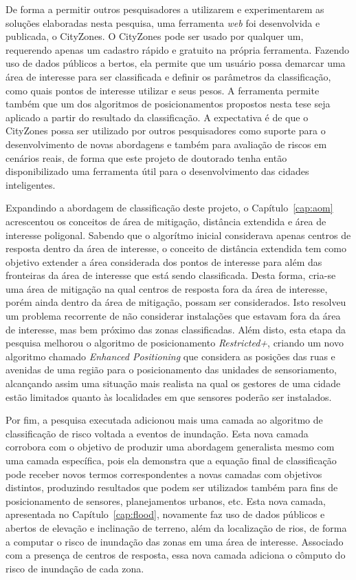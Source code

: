 De forma a permitir outros pesquisadores a utilizarem e experimentarem as soluções elaboradas nesta pesquisa, uma ferramenta \emph{web} foi desenvolvida e publicada, o CityZones. O CityZones pode ser usado por qualquer um, requerendo apenas um cadastro rápido e gratuito na própria ferramenta. Fazendo uso de dados públicos a bertos, ela permite que um usuário possa demarcar uma área de interesse para ser classificada e definir os parâmetros da classificação, como quais pontos de interesse utilizar e seus pesos. A ferramenta permite também que um dos algoritmos de posicionamentos propostos nesta tese seja aplicado a partir do resultado da classificação. A expectativa é de que o CityZones possa ser utilizado por outros pesquisadores como suporte para o desenvolvimento de novas abordagens e também para avaliação de riscos em cenários reais, de forma que este projeto de doutorado tenha então disponibilizado uma ferramenta útil para o desenvolvimento das cidades inteligentes.

Expandindo a abordagem de classificação deste projeto, o Capítulo~\ref{cap:aom} acrescentou os conceitos de área de mitigação, distância extendida e área de interesse poligonal. Sabendo que o algorítmo inicial considerava apenas centros de resposta dentro da área de interesse, o conceito de distância extendida tem como objetivo extender a área considerada dos pontos de interesse para além das fronteiras da área de interesse que está sendo classificada. Desta forma, cria-se uma área de mitigação na qual centros de resposta fora da área de interesse, porém ainda dentro da área de mitigação, possam ser considerados. Isto resolveu um problema recorrente de não considerar instalações que estavam fora da área de interesse, mas bem próximo das zonas classificadas. Além disto, esta etapa da pesquisa melhorou o algoritmo de posicionamento \emph{Restricted+}, criando um novo algoritmo chamado \emph{Enhanced Positioning} que considera as posições das ruas e avenidas de uma região para o posicionamento das unidades de sensoriamento, alcançando assim uma situação mais realista na qual os gestores de uma cidade estão limitados quanto às localidades em que sensores poderão ser instalados.

Por fim, a pesquisa executada adicionou mais uma camada ao algoritmo de classificação de risco voltada a eventos de inundação. Esta nova camada corrobora com o objetivo de produzir uma abordagem generalista mesmo com uma camada específica, pois ela demonstra que a equação final de classificação pode receber novos termos correspondentes a novas camadas com objetivos distintos, produzindo resultados que podem ser utilizados também para fins de posicionamento de sensores, planejamentos urbanos, etc. Esta nova camada, apresentada no Capítulo~\ref{cap:flood}, novamente faz uso de dados públicos e abertos de elevação e inclinação de terreno, além da localização de rios, de forma a computar o risco de inundação das zonas em uma área de interesse. Associado com a presença de centros de resposta, essa nova camada adiciona o cômputo do risco de inundação de cada zona.

